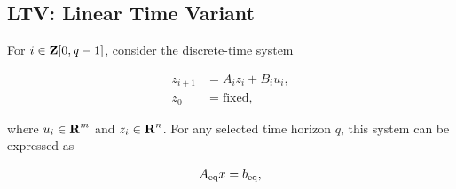 \documentclass{article}
\begin{document}
    \clearpage

\subsection{LTV: Linear Time Variant}
    
    For $i\in\textbf{Z}[0,q-1]$, consider the discrete-time system

    \begin{align*}
    z_{i+1} &= A_iz_i + B_iu_i,\\
    z_0 &= \text{fixed},
    \end{align*}

    where $u_i\in\textbf{R}^m$ and $z_i\in\textbf{R}^n$.
    For any selected time horizon $q$, 
    this system can be expressed as 

    \begin{align*}
        A_{\text{eq}} x = b_{\text{eq}},
    \end{align*}
\end{document}
